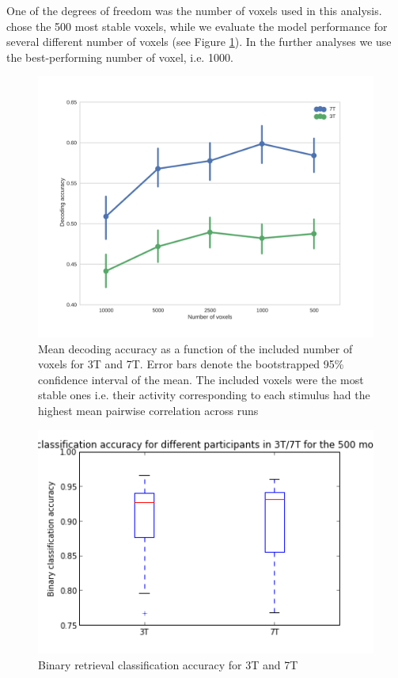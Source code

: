One of the degrees of freedom was the number of voxels used in this analysis. \cite{ML08} chose the 500 most stable voxels, while we evaluate the model performance for several different number of voxels (see Figure \ref{fig:voxelnr}). In the further analyses we use the best-performing number of voxel, i.e. 1000.
	
\begin{figure}
	\centering
	\includegraphics[width=\linewidth]{pics/nr_of_voxels_both}
	\caption{Mean decoding accuracy as a function of the included number of voxels for 3T and 7T. Error bars denote the bootstrapped 95\% confidence interval of the mean. The included voxels were the most stable ones i.e. their activity corresponding to each stimulus had the highest mean pairwise correlation across runs}
	\label{fig:voxelnr}
\end{figure}
 
 
 
\begin{figure}
	\centering
	\includegraphics[width=\linewidth]{pics/binary_retrieval_accuracy}
	\caption{Binary retrieval classification accuracy for 3T and 7T}
	\label{fig:binretr}
\end{figure}
 
